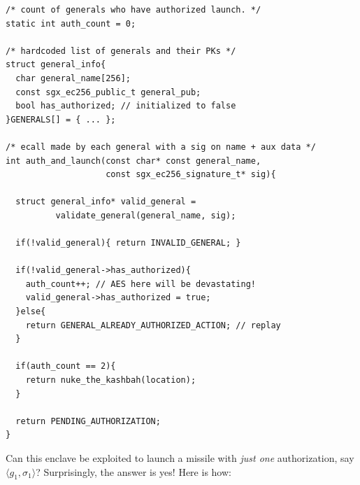\documentclass[letterpaper]{article}
\begin{document}
  \begin{center}
  \begin{lstlisting}[captionpos=b,
                     caption={An enclave suseptible to state
                       malleability}, label=code:malleability] 
/* count of generals who have authorized launch. */ 
static int auth_count = 0;

/* hardcoded list of generals and their PKs */ 
struct general_info{
  char general_name[256]; 
  const sgx_ec256_public_t general_pub; 
  bool has_authorized; // initialized to false 
}GENERALS[] = { ... };

/* ecall made by each general with a sig on name + aux data */ 
int auth_and_launch(const char* const general_name, 
                    const sgx_ec256_signature_t* sig){ 

  struct general_info* valid_general = 
          validate_general(general_name, sig);

  if(!valid_general){ return INVALID_GENERAL; }

  if(!valid_general->has_authorized){ 
    auth_count++; // AES here will be devastating!  
    valid_general->has_authorized = true; 
  }else{
    return GENERAL_ALREADY_AUTHORIZED_ACTION; // replay 
  }

  if(auth_count == 2){ 
    return nuke_the_kashbah(location); 
  }

  return PENDING_AUTHORIZATION; 
}
\end{lstlisting}
\end{center}

  Can this enclave be exploited to launch a missile with \textit{just
    one} authorization, say $\langle g_1, \sigma_1 \rangle$?
  Surprisingly, the answer is yes! Here is how:
\end{document}
